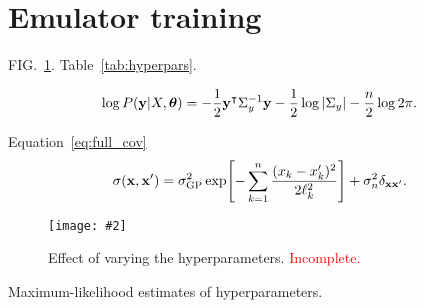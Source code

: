 \documentclass[aps,prc,reprint,superscriptaddress,amsmath]{revtex4-1}
\newcommand{\todo}[1]{\textcolor{red}{#1}}
\newcommand{\colfig}[3][t]{
  \begin{figure}[#1]
    \texttt{[image: \#2]}
    \caption{\label{fig:#2}#3}
  \end{figure}
}
\newcommand{\tran}{^\intercal}
\begin{document}
\appendix

\section{\label{app:train}Emulator training}

\newcommand{\vectheta}{\boldsymbol\theta}

FIG.~\ref{fig:training}.
Table~\ref{tab:hyperpars}.

\begin{equation}
  \log P(\y|X,\vectheta) = -\frac{1}{2} \y\tran \Sigma_y^{-1} \y - \frac{1}{2} \log |\Sigma_y| - \frac{n}{2} \log 2\pi.
\end{equation}

Equation~\eqref{eq:full_cov}
\begin{equation*}
  \sigma(\mathbf x, \mathbf x') = \sigma_\text{GP}^2 \exp\Biggl[ -\sum_{k=1}^n \frac{(x_k - x'_k)^2}{2\ell_k^2} \Biggr] + \sigma_n^2\delta_{\mathbf x\mathbf x'}.
\end{equation*}

\colfig{training}{
  Effect of varying the hyperparameters.
    \todo{Incomplete.}
}

\begin{table}
  \caption{
    \label{tab:hyperpars}
    Maximum-likelihood estimates of hyperparameters.
  }
  
\end{table}




\end{document}
